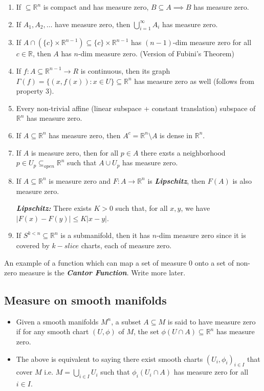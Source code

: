 \documentclass{article}
\newcommand{\R}{\mathbb{R}}
\begin{document}
\begin{enumerate}
  \item If $ \subseteq \R^n$ is compact and has measure zero, $B \subseteq A \implies B$ has measure zero.
  \item If $A_1, A_2, \dots$ have measure zero, then $\bigcup_{i = 1}^{\infty} A_i$ has measure zero.
  \item If $A \cap \left(\{c\} \times \R^{n-1}\right) \subseteq \{c\} \times \R^{n-1}$ has $(n-1)$-dim measure zero for all $c \in \R$, then $A$ has $n$-dim measure zero. (Version of Fubini's Theorem)
  \item If $f : A \subseteq \R^{n-1} \rightarrow R$ is continuous, then its graph $\Gamma(f) = \{(x, f(x)) :x \in U \} \subseteq \R^n$ has measure zero as well (follows from property 3).
  \item Every non-trivial affine (linear subspace + constant translation) subspace of $\R^n$ has measure zero.
  \item If $A \subseteq \R^n$ has measure zero, then $A^c = \R^n \setminus A$ is dense in $\R^n$.
  \item If $A$ is measure zero, then for all $p \in A$ there exsts a neighborhood $p \in U_p \subseteq_{open} \R^n$ such that $A \cup U_p$ has measure zero.
  \item If $A \subseteq \R^n$ is measure zero and $F : A \rightarrow \R^n$ is \emph{\textbf{Lipschitz}}, then $F(A)$ is also measure zero.
  \begin{dottedbox}
    \emph{\textbf{Lipschitz:}} There exists $K > 0$ such that, for all $x,y$, we have $|F(x) - F(y)| \leq K |x-y|$.
  \end{dottedbox}
  \item If $S^{k < n} \subseteq \R^{n}$ is a submanifold, then it has $n$-dim measure zero since it is covered by $k-slice$ charts, each of measure zero.
\end{enumerate}

\vskip 0.5cm
\begin{dottedbox}
  An example of a function which can map a set of measure 0 onto a set of non-zero measure is the \emph{\textbf{Cantor Function}}. Write more later.
\end{dottedbox}


\vskip 1cm
\subsection{Measure on smooth manifolds}

\vskip 0.5cm
\begin{mathdefinitionbox}{}
  \begin{itemize}
    \item Given a smooth manifolds $M^n$, a subset $A \subseteq M$ is said to have measure zero if for any smooth chart $(U, \phi)$ of $M$, the set $\phi(U \cap A) \subseteq \R^{n}$ has measure zero.
    \item The above is equivalent to saying there exist smooth charts $(U_i, \phi_i)_{i \in I}$ that cover $M$ i.e. $M = \bigcup_{i \in I} U_i$ such that $\phi_i(U_i \cap A)$ has measure zero for all $i \in I$. 
  \end{itemize}
\end{mathdefinitionbox}
\end{document}
